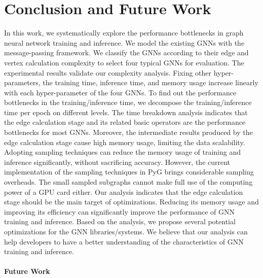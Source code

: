 \section{Conclusion and Future Work}
\label{sec:conclusion}

In this work, we systematically explore the performance bottlenecks in graph neural network training and inference.
%
We model the existing GNNs with the message-passing framework. 
%
We classify the GNNs according to their edge and vertex calculation complexity to select four typical GNNs for evaluation. 
%
The experimental results validate our complexity analysis.
%
Fixing other hyper-parameters, the training time, inference time, and memory usage increase linearly with each hyper-parameter of the four GNNs.
%
To find out the performance bottlenecks in the training/inference time, we decompose the training/inference time per epoch on different levels.
%
The time breakdown analysis indicates that the edge calculation stage and its related basic operators are the performance bottlenecks for most GNNs.
%
Moreover, the intermediate results produced by the edge calculation stage cause high memory usage, limiting the data scalability.
%
Adopting sampling techniques can reduce the memory usage of training and inference significantly, without sacrificing accuracy. 
%
However, the current implementation of the sampling techniques in PyG brings considerable sampling overheads.
%
The small sampled subgraphs cannot make full use of the computing power of a GPU card either.
% 
Our analysis indicates that the edge calculation stage should be the main target of optimizations.
%
Reducing its memory usage and improving its efficiency can significantly improve the performance of GNN training and inference.
%
Based on the analysis, we propose several potential optimizations for the GNN libraries/systems.
%
We believe that our analysis can help developers to have a better understanding of the characteristics of GNN training and inference.

\paragraph{Future Work}

